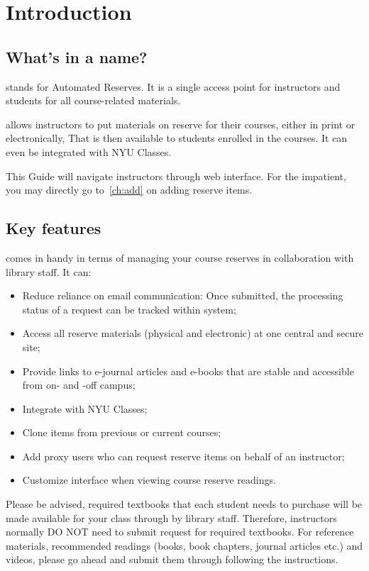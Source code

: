 \chapter{Introduction}
\label{ch:intro}
\section{What's in a name?}
\label{sec:}
\ares stands for {\imp A}utomated {\imp Res}erves. It is a single access point for instructors and students for all course-related materials. 

\ares allows instructors to put materials on reserve for their courses, either in print or electronically, That is then available to students enrolled in the courses. It can even be integrated with NYU Classes. 

This Guide will navigate instructors through \ares web interface. For the impatient, you may directly go to~\autoref{ch:add} on adding reserve items.

\section{Key features}
\ares comes in handy in terms of managing your course reserves in collaboration with library staff.
It can:
\begin{itemize}
    \item Reduce reliance on email communication: Once submitted, the processing status of a request can be tracked within \ares system;
    \item Access all reserve materials (physical and electronic) at one central and secure site;
    \item Provide links to e-journal articles and e-books that are stable and accessible from on- and -off campus;
    \item Integrate with NYU Classes;
    \item Clone items from previous or current courses;
    \item Add proxy users who can request reserve items on behalf of an instructor;
    \item Customize interface when viewing course reserve readings.
\end{itemize}

\vspace*{3ex}
\begin{table}[h]
    \centering
    \begin{notebox}
    Please be advised, {\imp required textbooks} that each student needs to purchase will be made available for your class through \ares by library staff. Therefore, instructors normally {\imp DO NOT} need to submit request for required textbooks. 
    \tcblower
    For {\imp reference materials}, {\imp recommended readings (books, book chapters, journal articles etc.)} and {\imp videos}, please go ahead and submit them through \ares following the instructions. 
    \end{notebox}
    \label{note: required texts}
\end{table}
